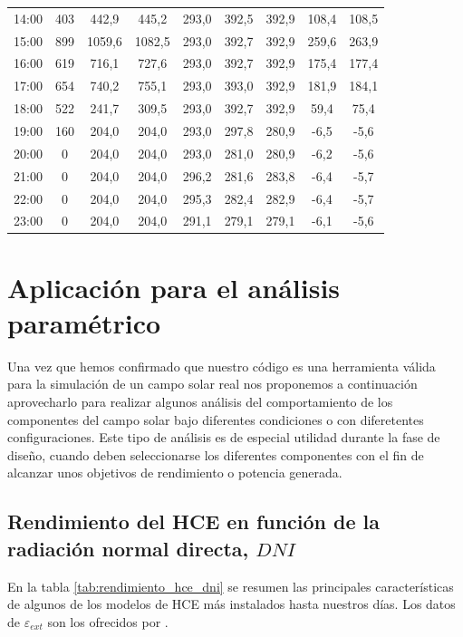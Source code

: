 \begin{table}[!h]
{\begin{tabular}{ccccccccc}
14:00 & 403 & 442,9  & 445,2  & 293,0 & 392,5 & 392,9 & 108,4 & 108,5 \\
15:00 & 899 & 1059,6 & 1082,5 & 293,0 & 392,7 & 392,9 & 259,6 & 263,9 \\
16:00 & 619 & 716,1  & 727,6  & 293,0 & 392,7 & 392,9 & 175,4 & 177,4 \\
17:00 & 654 & 740,2  & 755,1  & 293,0 & 393,0 & 392,9 & 181,9 & 184,1 \\
18:00 & 522 & 241,7  & 309,5  & 293,0 & 392,7 & 392,9 & 59,4  & 75,4  \\
19:00 & 160 & 204,0  & 204,0  & 293,0 & 297,8 & 280,9 & -6,5  & -5,6  \\
20:00 & 0   & 204,0  & 204,0  & 293,0 & 281,0 & 280,9 & -6,2  & -5,6  \\
21:00 & 0   & 204,0  & 204,0  & 296,2 & 281,6 & 283,8 & -6,4  & -5,7  \\
22:00 & 0   & 204,0  & 204,0  & 295,3 & 282,4 & 282,9 & -6,4  & -5,7  \\
23:00 & 0   & 204,0  & 204,0  & 291,1 & 279,1 & 279,1 & -6,1  & -5,6 
\end{tabular}%
}
\end{table}


\section{Aplicación para el análisis paramétrico}
\label{analisis-parametrico}

Una vez que hemos confirmado que nuestro código es una herramienta válida para la simulación de un campo solar real nos proponemos a continuación aprovecharlo para realizar algunos análisis del comportamiento de los componentes del campo solar bajo diferentes condiciones o con diferetentes configuraciones. Este tipo de análisis es de especial utilidad durante la fase de diseño, cuando deben seleccionarse los diferentes componentes con el fin de alcanzar unos objetivos de rendimiento o potencia generada.

\subsection{Rendimiento del HCE en función de la radiación normal directa, $DNI$}

En la tabla \ref{tab:rendimiento_hce_dni} se resumen las principales características de algunos de los modelos de HCE más instalados hasta nuestros días. Los datos de $\varepsilon_{ext}$ son los ofrecidos por \cite{barberofresnoDesarrolloModeloTeorico2018}.

